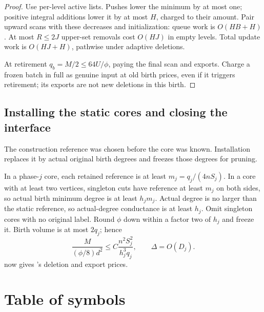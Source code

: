 \documentclass[11pt]{article}
\theoremstyle{remark}
\begin{document}
\begin{proof}
Use per-level active lists.
Pushes lower the minimum by at most one; positive integral additions lower it by
at most $H$, charged to their amount.
Pair upward scans with these decreases and initialization: queue work is
$O(HB+H)$.
At most $R\le2J$ upper-set removals cost $O(HJ)$ in empty levels.
Total update work is $O(HJ+H)$, pathwise under adaptive deletions.

At retirement $q_b=M/2\le64U/\phi$, paying the final scan and exports.
Charge a frozen batch in full as genuine input at old birth prices, even if it
triggers retirement; its exports are not new deletions in this birth.
\end{proof}

\subsection{Installing the static cores and closing the interface}

The construction reference was chosen before the core was known.
Installation replaces it by actual original birth degrees and freezes those
degrees for pruning.

In a phase-$j$ core, each retained reference is at least $m_j=q_j/(4nS_j)$.
In a core with at least two vertices, singleton cuts have reference at least
$m_j$ on both sides, so actual birth minimum degree is at least $h_jm_j$.
Actual degree is no larger than the static reference, so actual-degree
conductance is at least $h_j$.
Omit singleton cores with no original label.
Round $\phi$ down within a factor two of $h_j$ and freeze it.
Birth volume is at most $2q_j$; hence
\[
 \frac{M}{(\phi/8)d^2}
 \le C\frac{n^2S_j^2}{h_j^3q_j},\qquad
 \Delta=O(D_j).
\]
 now gives 's deletion and
export prices.


\clearpage
\section{Table of symbols}
\label{sec:ram27-symbols}
\end{document}
